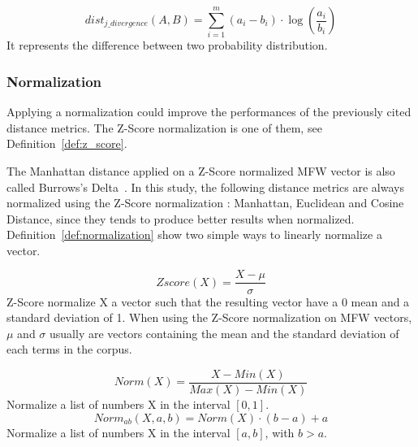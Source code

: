 \begin{definition}
  \begin{equation}
    dist_{j\_divergence}(A, B) = \sum_{i=1}^{m} (a_i - b_i) \cdot \log(\frac{a_i}{b_i})
  \end{equation}
  It represents the difference between two probability distribution.
\end{definition}


\subsubsection{Normalization}

Applying a normalization could improve the performances of the previously cited distance metrics.
The Z-Score normalization is one of them, see Definition~\ref{def:z_score}.

The Manhattan distance applied on a Z-Score normalized MFW vector is also called Burrows's Delta~\cite{savoy_stylo}.
In this study, the following distance metrics are always normalized using the Z-Score normalization : Manhattan, Euclidean and Cosine Distance, since they tends to produce better results when normalized.
Definition~\ref{def:normalization} show two simple ways to linearly normalize a vector.

\begin{definition}
  \label{def:z_score}
  \begin{equation}
    Zscore(X) = \frac{X - \mu}{\sigma}
  \end{equation}
  Z-Score normalize X a vector such that the resulting vector have a 0 mean and a standard deviation of 1.
  When using the Z-Score normalization on MFW vectors, $\mu$ and $\sigma$ usually are vectors containing the mean and the standard deviation of each terms in the corpus.
\end{definition}

\begin{definition}
  \label{def:normalization}
  \begin{equation}
    Norm(X) = \frac{X - Min(X)}{Max(X) - Min(X)}
  \end{equation}
  Normalize a list of numbers X in the interval $[0, 1]$.
  \begin{equation}
    Norm_{ab}(X, a, b) = Norm(X) \cdot (b - a) + a
  \end{equation}
  Normalize a list of numbers X in the interval $[a, b]$, with $b > a$.
\end{definition}

